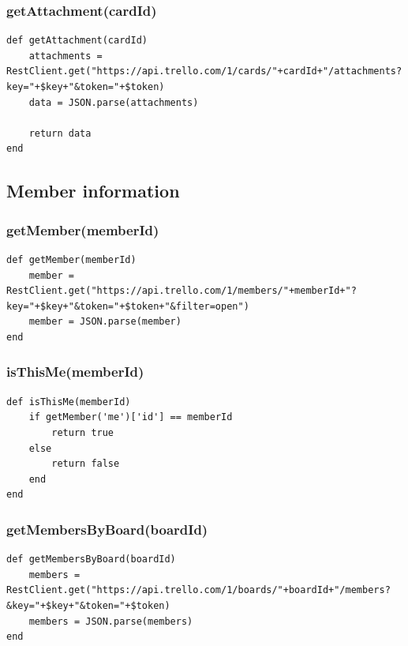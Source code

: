 \subsubsection{getAttachment(cardId)}
\begin{lstlisting}[aboveskip=1\baselineskip, caption= getAttachment(), label=listing057]
def getAttachment(cardId)
	attachments = RestClient.get("https://api.trello.com/1/cards/"+cardId+"/attachments?key="+$key+"&token="+$token)
	data = JSON.parse(attachments)

	return data
end
\end{lstlisting}

\subsection{Member information}

\subsubsection{getMember(memberId)}
\begin{lstlisting}[aboveskip=1\baselineskip, caption= getMember(), label=listing058]
def getMember(memberId)
	member = RestClient.get("https://api.trello.com/1/members/"+memberId+"?key="+$key+"&token="+$token+"&filter=open")
	member = JSON.parse(member)
end
\end{lstlisting}

\subsubsection{isThisMe(memberId)}
\begin{lstlisting}[aboveskip=1\baselineskip, caption= isThisMe(), label=listing059]
def isThisMe(memberId)
	if getMember('me')['id'] == memberId
		return true
	else
		return false
	end
end
\end{lstlisting}

\subsubsection{getMembersByBoard(boardId)}
\begin{lstlisting}[aboveskip=1\baselineskip, caption= getMembersByBoard(), label=listing060]
def getMembersByBoard(boardId)
	members = RestClient.get("https://api.trello.com/1/boards/"+boardId+"/members?&key="+$key+"&token="+$token)
	members = JSON.parse(members)	
end
\end{lstlisting}

